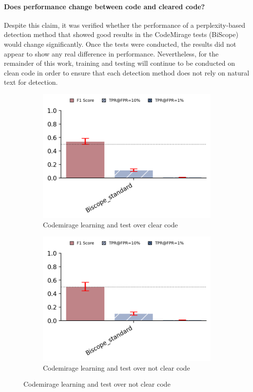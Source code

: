 \paragraph{Does performance change between code and cleared code?}
Despite this claim, it was verified whether the performance of a 
perplexity-based detection method that showed good results in the 
CodeMirage tests (BiScope) would change significantly. 
Once the tests were conducted, the results did not appear 
to show any real difference in performance. Nevertheless, 
for the remainder of this work, training and testing will 
continue to be conducted on clean code in order to ensure 
that each detection method does not rely on natural text 
for detection.
\begin{figure}[H]
    \centering
    \begin{subfigure}[t]{0.45\textwidth}
        \centering
        \includegraphics[width=\linewidth]{img/no_clearpng.png}
        \caption{Codemirage learning and test over clear code}
        \label{fig:ttb2gg}
    \end{subfigure}
    \hfill
    \begin{subfigure}[t]{0.45\textwidth}
        \centering
        \includegraphics[width=\linewidth]{img/clearù.png}
        \caption{Codemirage learning and test over not clear code}
        \label{fig:attb2gg}
    \end{subfigure}
\end{figure}

